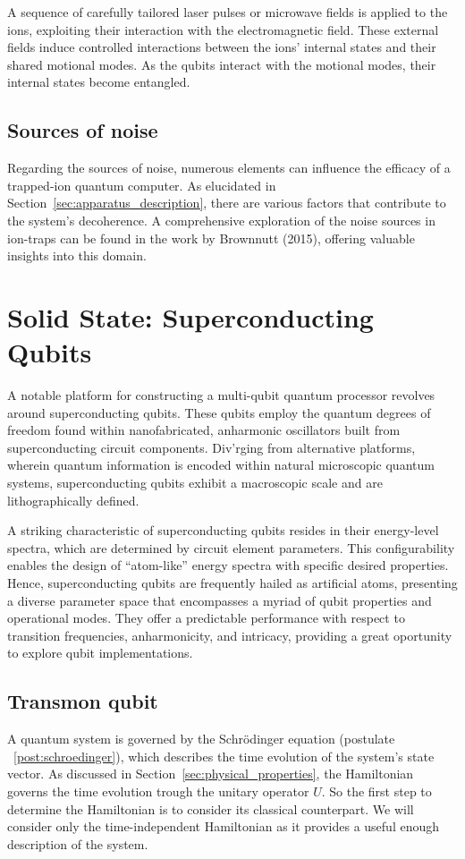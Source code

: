 \documentclass[
  journal=largetwo,
  year=2023,
]{cup-journal}
\begin{document}
A sequence of carefully tailored laser pulses or microwave fields is applied to the ions, exploiting their interaction with the electromagnetic field. These external fields induce controlled interactions between the ions' internal states and their shared motional modes.
As the qubits interact with the motional modes, their internal states become entangled.

\subsection{Sources of noise}

Regarding the sources of noise, numerous elements can influence the efficacy of a trapped-ion quantum computer. As elucidated in Section~\ref{sec:apparatus_description}, there are various factors that contribute to the system's decoherence. A comprehensive exploration of the noise sources in ion-traps can be found in the work by Brownnutt (2015)\autocite{brownnutt_2015_iontrap}, offering valuable insights into this domain.

\section{Solid State: Superconducting Qubits}
\label{cap:superconductor}

A notable platform for constructing a multi-qubit quantum processor revolves around superconducting qubits. These qubits employ the quantum degrees of freedom found within nanofabricated, anharmonic oscillators built from superconducting circuit components. Div'rging from alternative platforms, wherein quantum information is encoded within natural microscopic quantum systems, superconducting qubits exhibit a macroscopic scale and are lithographically defined.

A striking characteristic of superconducting qubits resides in their energy-level spectra, which are determined by circuit element parameters. This configurability enables the design of ``atom-like'' energy spectra with specific desired properties. Hence, superconducting qubits are frequently hailed as artificial atoms, presenting a diverse parameter space that encompasses a myriad of qubit properties and operational modes. They offer a predictable performance with respect to transition frequencies, anharmonicity, and intricacy, providing a great oportunity to explore qubit implementations.

\subsection{Transmon qubit}
A quantum system is governed by the Schrödinger equation (postulate ~\ref{post:schroedinger}), which describes the time evolution of the system's state vector. As discussed in Section~\ref{sec:physical_properties}, the Hamiltonian governs the time evolution trough the unitary operator \(U\). So the first step to determine the Hamiltonian is to consider its classical counterpart. We will consider only the time-independent Hamiltonian as it provides a useful enough description of the system.
\end{document}
